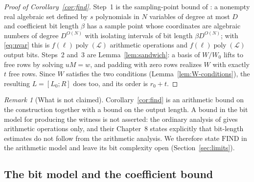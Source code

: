 \documentclass[journal]{IEEEtran}
\theoremstyle{plainn}
\theoremstyle{remark}
\newtheorem{remark}{Remark}
\begin{document}
\begin{proof}[Proof of Corollary~\ref{cor:find}]
Step~1 is the sampling-point bound of \cite[Ch.~13]{bpr06}: a nonempty real algebraic set defined by
$s$ polynomials in $N$ variables of degree at most $D$ and coefficient bit length $\beta$ has a sample
point whose coordinates are algebraic numbers of degree $D^{O(N)}$ with isolating intervals of bit
length $\beta D^{O(N)}$; with \eqref{eq:nvar} this is $f(\ell)\operatorname{poly}(\mathcal L)$ arithmetic
operations and $f(\ell)\operatorname{poly}(\mathcal L)$ output bits. Steps~2 and~3 are
Lemma~\ref{lem:sandwich}: a basis of $W/W_0$ lifts to free rows by solving $uM=w$, and padding with
zero rows realizes $W$ with exactly $t$ free rows. Since $W$ satisfies the two conditions
(Lemma~\ref{lem:W-conditions}), the resulting $L=[L_0;R]$ does too, and its order is $r_0+t$.
\end{proof}

\begin{remark}[What is not claimed]\label{rem:find-bit}
Corollary~\ref{cor:find} is an arithmetic bound on the construction together with a bound on the
output length. A bound in the bit model for producing the witness is not asserted: the ordinary
analysis of \cite{bpr06} gives arithmetic operations only, and their Chapter~8 states explicitly
that bit-length estimates do not follow from the arithmetic analysis. We therefore state
$\mathrm{FIND}$ in the arithmetic model and leave its bit complexity open
(Section~\ref{sec:limits}).
\end{remark}

\subsection{The bit model and the coefficient bound}\label{sec:bitsize}
\end{document}
